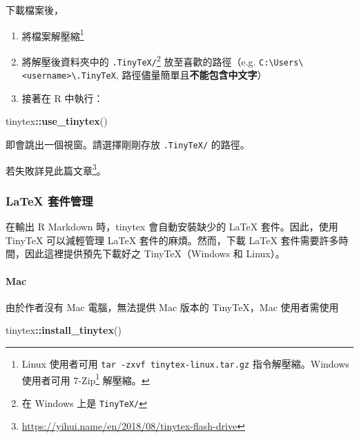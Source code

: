 \documentclass[oneside]{book}
\newenvironment{Shaded}{\begin{snugshade}}{\end{snugshade}}
\newcommand{\KeywordTok}[1]{\textcolor[rgb]{0.13,0.29,0.53}{\textbf{#1}}}
\newcommand{\NormalTok}[1]{#1}
\newcommand{\OperatorTok}[1]{\textcolor[rgb]{0.81,0.36,0.00}{\textbf{#1}}}
\renewcommand{\href}[2]{#2\footnote{\url{#1}}}
\begin{document}
下載檔案後，

\begin{enumerate}
\def\labelenumi{\alph{enumi})}
\item
  將檔案解壓縮\footnote{Linux 使用者可用 \texttt{tar\ -zxvf\ tinytex-linux.tar.gz} 指令解壓縮。Windows 使用者可用 \href{https://www.developershome.com/7-zip/}{7-Zip} 解壓縮。}
\item
  將解壓後資料夾中的 \texttt{.TinyTeX/}\footnote{在 Windows 上是 \texttt{TinyTeX/}} 放至喜歡的路徑（e.g. \texttt{C:\textbackslash{}Users\textbackslash{}\textless{}username\textgreater{}\textbackslash{}.TinyTeX}, 路徑儘量簡單且\textbf{不能包含中文字}）
\item
  接著在 R 中執行：
\end{enumerate}

\begin{Shaded}
\begin{Highlighting}[]
\NormalTok{tinytex}\OperatorTok{::}\KeywordTok{use_tinytex}\NormalTok{()}
\end{Highlighting}
\end{Shaded}

即會跳出一個視窗。請選擇剛剛存放 \texttt{.TinyTeX/} 的路徑。

若失敗詳見\href{https://yihui.name/en/2018/08/tinytex-flash-drive}{此篇文章}。

\hypertarget{tinytex-manage}{%
\subsubsection{LaTeX 套件管理}\label{tinytex-manage}}

在輸出 R Markdown 時，tinytex 會自動安裝缺少的 LaTeX 套件。因此，使用 TinyTeX 可以減輕管理 LaTeX 套件的麻煩。然而，下載 LaTeX 套件需要許多時間，因此這裡提供預先下載好之 TinyTeX（Windows 和 Linux）。

\hypertarget{mac}{%
\paragraph{Mac}\label{mac}}

由於作者沒有 Mac 電腦，無法提供 Mac 版本的 TinyTeX，Mac 使用者需使用

\begin{Shaded}
\begin{Highlighting}[]
\NormalTok{tinytex}\OperatorTok{::}\KeywordTok{install_tinytex}\NormalTok{()}
\end{Highlighting}
\end{Shaded}
\end{document}
